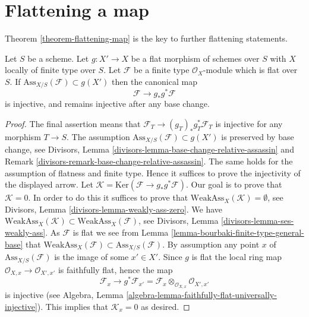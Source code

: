 \section{Flattening a map}
\label{section-fattening-map}

\noindent
Theorem \ref{theorem-flattening-map}
is the key to further flattening statements.

\begin{lemma}
\label{lemma-universally-separating}
Let $S$ be a scheme.
Let $g : X' \to X$ be a flat morphism of schemes over $S$
with $X$ locally of finite type over $S$.
Let $\mathcal{F}$ be a finite type $\mathcal{O}_X$-module
which is flat over $S$. If $\text{Ass}_{X/S}(\mathcal{F}) \subset g(X')$
then the canonical map
$$
\mathcal{F} \longrightarrow g_*g^*\mathcal{F}
$$
is injective, and remains injective after any base change.
\end{lemma}

\begin{proof}
The final assertion means that $\mathcal{F}_T \to (g_T)_*g_T^*\mathcal{F}_T$
is injective for any morphism $T \to S$. The assumption
$\text{Ass}_{X/S}(\mathcal{F}) \subset g(X')$ is preserved by base change, see
Divisors, Lemma \ref{divisors-lemma-base-change-relative-assassin} and
Remark \ref{divisors-remark-base-change-relative-assassin}.
The same holds for the assumption of flatness and finite type.
Hence it suffices to prove the injectivity of the displayed arrow.
Let $\mathcal{K} = \text{Ker}(\mathcal{F} \to g_*g^*\mathcal{F})$.
Our goal is to prove that $\mathcal{K} = 0$.
In order to do this it suffices to prove that
$\text{WeakAss}_X(\mathcal{K}) = \emptyset$, see
Divisors, Lemma \ref{divisors-lemma-weakly-ass-zero}.
We have
$\text{WeakAss}_X(\mathcal{K}) \subset \text{WeakAss}_X(\mathcal{F})$, see
Divisors, Lemma \ref{divisors-lemma-ses-weakly-ass}.
As $\mathcal{F}$ is flat we see from
Lemma \ref{lemma-bourbaki-finite-type-general-base}
that $\text{WeakAss}_X(\mathcal{F}) \subset \text{Ass}_{X/S}(\mathcal{F})$.
By assumption any point $x$ of $\text{Ass}_{X/S}(\mathcal{F})$
is the image of some $x' \in X'$. Since $g$ is flat the
local ring map $\mathcal{O}_{X, x} \to \mathcal{O}_{X', x'}$
is faithfully flat, hence the map
$$
\mathcal{F}_x
\longrightarrow
g^*\mathcal{F}_{x'} =
\mathcal{F}_x \otimes_{\mathcal{O}_{X, x}} \mathcal{O}_{X', x'}
$$
is injective (see
Algebra, Lemma \ref{algebra-lemma-faithfully-flat-universally-injective}).
This implies that $\mathcal{K}_x = 0$ as desired.
\end{proof}

